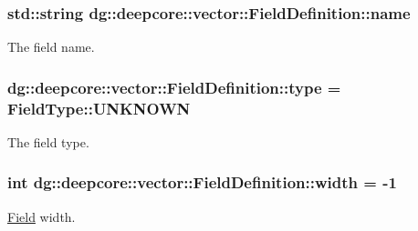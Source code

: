 \subsubsection[{\texorpdfstring{name}{name}}]{\setlength{\rightskip}{0pt plus 5cm}std\+::string dg\+::deepcore\+::vector\+::\+Field\+Definition\+::name}\hypertarget{structdg_1_1deepcore_1_1vector_1_1_field_definition_afe210a024b6230d92260b73d4b0354b9}{}\label{structdg_1_1deepcore_1_1vector_1_1_field_definition_afe210a024b6230d92260b73d4b0354b9}


The field name. 

\subsubsection[{\texorpdfstring{type}{type}}]{ dg\+::deepcore\+::vector\+::\+Field\+Definition\+::type = {\bf Field\+Type\+::\+U\+N\+K\+N\+O\+WN}}\hypertarget{structdg_1_1deepcore_1_1vector_1_1_field_definition_a50e975eabe1343b91e398322cc990aea}{}\label{structdg_1_1deepcore_1_1vector_1_1_field_definition_a50e975eabe1343b91e398322cc990aea}


The field type. 

\subsubsection[{\texorpdfstring{width}{width}}]{\setlength{\rightskip}{0pt plus 5cm}int dg\+::deepcore\+::vector\+::\+Field\+Definition\+::width = -\/1}\hypertarget{structdg_1_1deepcore_1_1vector_1_1_field_definition_ae8230841926a1f3c2800397adad755d4}{}\label{structdg_1_1deepcore_1_1vector_1_1_field_definition_ae8230841926a1f3c2800397adad755d4}


\hyperlink{structdg_1_1deepcore_1_1vector_1_1_field}{Field} width. 

